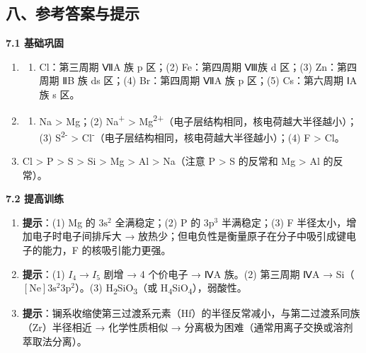 \documentclass[a4paper,11pt]{ctexart}
\providecommand{\tightlist}{\setlength{\itemsep}{0pt}\setlength{\parskip}{0pt}}
\begin{document}
\subsection{八、参考答案与提示}\label{ux516bux53c2ux8003ux7b54ux6848ux4e0eux63d0ux793a}

\textbf{7.1 基础巩固}

\begin{enumerate}
\def\labelenumi{\arabic{enumi}.}
\tightlist
\item
  \begin{enumerate}
  \def\labelenumii{(\arabic{enumii})}
  \tightlist
  \item
    Cl：第三周期 ⅦA 族 p 区；(2) Fe：第四周期 Ⅷ族 d 区；(3) Zn：第四周期 ⅡB 族 ds 区；(4) Br：第四周期 ⅦA 族 p 区；(5) Cs：第六周期 ⅠA 族 s 区。
  \end{enumerate}
\item
  \begin{enumerate}
  \def\labelenumii{(\arabic{enumii})}
  \tightlist
  \item
    Na \textgreater{} Mg；(2) Na\textsuperscript{+} \textgreater{} Mg\textsuperscript{2+}（电子层结构相同，核电荷越大半径越小）；(3) S\textsuperscript{2-} \textgreater{} Cl\textsuperscript{-}（电子层结构相同，核电荷越大半径越小）；(4) F \textgreater{} Cl。
  \end{enumerate}
\item
  Cl \textgreater{} P \textgreater{} S \textgreater{} Si \textgreater{} Mg \textgreater{} Al \textgreater{} Na（注意 P \textgreater{} S 的反常和 Mg \textgreater{} Al 的反常）。
\end{enumerate}

\textbf{7.2 提高训练}

\begin{enumerate}
\def\labelenumi{\arabic{enumi}.}
\setcounter{enumi}{3}
\item
  \textbf{提示}：(1) Mg 的 \(3\mathrm{s}^2\) 全满稳定；(2) P 的 \(3\mathrm{p}^3\) 半满稳定；(3) F 半径太小，增加电子时电子间排斥大 → 放热少；但电负性是衡量原子在分子中吸引成键电子的能力，F 的核吸引能力更强。
\item
  \textbf{提示}：(1) \(I_4\to I_5\) 剧增 → 4 个价电子 → ⅣA 族。(2) 第三周期 ⅣA → Si（\([\mathrm{Ne}] 3\mathrm{s}^2 3\mathrm{p}^2\)）。(3) H\textsubscript{2}SiO\textsubscript{3}（或 H\textsubscript{4}SiO\textsubscript{4}），弱酸性。
\item
  \textbf{提示}：镧系收缩使第三过渡系元素（Hf）的半径反常减小，与第二过渡系同族（Zr）半径相近 → 化学性质相似 → 分离极为困难（通常用离子交换或溶剂萃取法分离）。
\end{enumerate}
\end{document}
